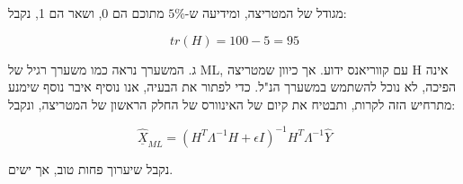 \documentclass[a4paper]{iacas}
\begin{document}
\begin{hebrew}

מגודל של המטריצה, ומידיעה ש-$5\%$ מתוכם הם 0, ושאר הם 1, נקבל:
\end{hebrew}
\begin{equation*}
tr(H) = 100 - 5 = 95
\end{equation*}

\begin{hebrew}
ג. המשערך נראה כמו משערך רגיל של ML, עם קווריאנס ידוע.  אך כיוון שמטריצה H אינה הפיכה, לא נוכל להשתמש במשערך הנ"ל. כדי לפתור את הבעיה, אנו נוסיף איבר נוסף שימנע מתרחיש הזה לקרות, ותבטיח את קיום של האינוורס של החלק הראשון של המטריצה, ונקבל:
\end{hebrew}

\begin{equation*}
\underline{\hat{X}}_{ML} = (H^{T}\Lambda^{-1}H + \epsilon I)^{-1}H^{T}\Lambda^{-1}\hat{Y}
\end{equation*}
\begin{hebrew}
נקבל שיערוך פחות טוב, אך ישים.
\end{hebrew}





\end{document}
